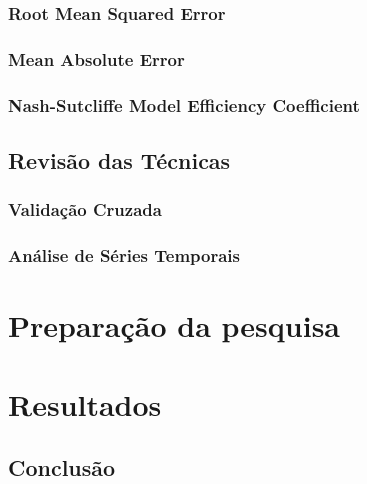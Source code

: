 \documentclass[
	12pt,				%
	openright,			%
	twoside,			%
	a4paper,			%
	english,			%
	french,				%
	spanish,			%
	brazil				%
	]{abntex2}
\begin{document}
    \section{Root Mean Squared Error}
    
    \section{Mean Absolute Error}
    
    \section{Nash-Sutcliffe Model Efficiency Coefficient}
    

\chapter{Revisão das Técnicas}
    \lipsum[1] 
    \section{Validação Cruzada}
    
    \section{Análise de Séries Temporais}
    

\part{Preparação da pesquisa}

\part{Resultados}



\chapter{Conclusão}

\lipsum[31-36]

\postextual
\end{document}

